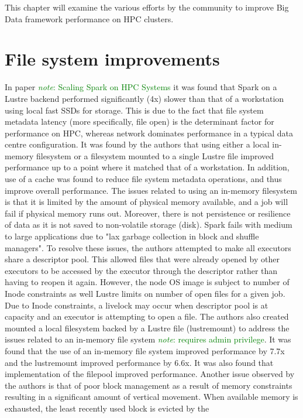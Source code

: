 \documentclass{report}
\newcommand{\note}[1]{\textcolor{green}{\textit{note}: #1}}
\begin{document}
    This chapter will examine the various efforts by the community to improve
Big Data framework performance on HPC clusters.
	
    \section{File system improvements}
	

    In paper \note{Scaling Spark on HPC Systems} it was found that Spark on a
Lustre backend performed significantly (4x) slower than that of a workstation
using local fast SSDs for storage. This is due to the fact that file system
metadata latency (more specifically, file open) is the determinant factor for
performance on HPC, whereas network dominates performance in a typical data
centre configuration. It was found by the authors that using either a local
in-memory filesystem or a filesystem mounted to a single Lustre file improved
performance up to a point where it matched that of a workstation. In addition,
use of a cache was found to reduce file system metadata operations, and thus
improve overall performance.  The issues related to using an in-memory
filesystem is that it is limited by the amount of physical memory available, and
a job will fail if physical memory runs out. Moreover, there is not persistence
or resilience of data as it is not saved to non-volatile storage (disk). Spark
fails with medium to large applications due to "lax garbage collection in block
and shuffle managers". To resolve these issues, the authors attempted to make
all executors share a descriptor pool. This allowed files that were already
opened by other executors to be accessed by the executor through the descriptor
rather than having to reopen it again. However, the node OS image is subject to
number of Inode constraints as well Lustre limits on number of open files for a
given job. Due to Inode constraints, a livelock may occur when descriptor pool
is at capacity and an executor is attempting to open a file. The authors also
created mounted a local filesystem backed by a Lustre file (lustremount) to
address the issues related to an in-memory file system \note{requires admin
privilege}. It was found that the use of an in-memory file system improved
performance by 7.7x and the lustremount improved performance by 6.6x. It was
also found that implementation of the filepool improved performance.  Another
issue observed by the authors is that of poor block management as a result of
memory constraints resulting in a significant amount of vertical movement. When
available memory is exhausted, the least recently used block is evicted by the
\end{document}
